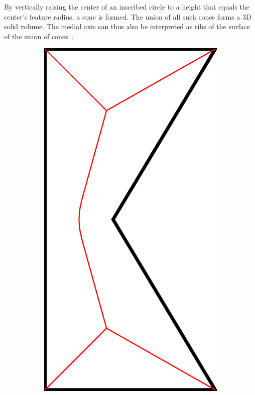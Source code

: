 By vertically raising the center of an inscribed circle to a height that equals the center's feature radius, a cone is formed. 
The union of all such cones forms a 3D solid volume. 
The medial axis can thus also be interpreted as ribs of the surface of the union of cones~\cite{blum1967transformation}.



\begin{figure}\centering
\setlength{\figwidth}{0.24\columnwidth}
\setlength{\figwidthTwo}{0.3\columnwidth}
\begin{subfigure}[t]{\figwidth}\centering
\includegraphics[height=\figwidthTwo]{sources/method/simple_skeleton_mat}

\end{subfigure}
\end{figure}
